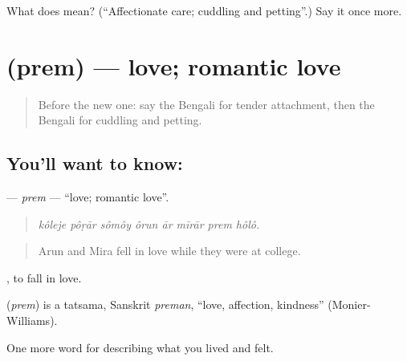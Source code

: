 \begin{tcolorbox}[breakable,colback=teal!4,colframe=teal!35!black,title={Before you move on}]
What does  mean? (\textquotedblleft{}Affectionate care; cuddling and petting\textquotedblright{}.) Say it once more.
\end{tcolorbox}
\section[\texorpdfstring{\bn{প্রেম} (prem)}{প্রেম (prem)}]{ (prem) — love; romantic love}

\label{lesson:BN-C449-prem}



\begin{quote}
Before the new one: say the Bengali for tender attachment, then the Bengali for cuddling and petting.
\end{quote}

\subsection*{You'll want to know: }
\textbf{} — \emph{prem} — \textquotedblleft{}love; romantic love\textquotedblright{}.

\begin{quote}
       
\end{quote}

\begin{quote}
\emph{kôleje pôṛār sômôy ôrun ār mīrār prem hôlô.}
\end{quote}

\begin{quote}
Arun and Mira fell in love while they were at college.
\end{quote}

 , to fall in love.

\begin{cousinweb}
\textbf{} (\emph{prem}) is a tatsama, Sanskrit \emph{preman}, \textquotedblleft{}love, affection, kindness\textquotedblright{} (Monier-Williams).
\end{cousinweb}

\begin{grammarlens}[title={What you've built}]
One more word for describing what you lived and felt.
\end{grammarlens}

